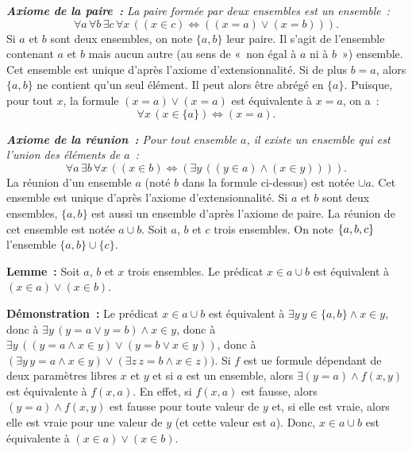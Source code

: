 \noindent\textit{\textbf{Axiome de la paire :} La paire formée par deux ensembles est un ensemble :}
\begin{equation*}
    \forall a \, \forall b \, \exists c \, \forall x \, (
        (x \in c) \Leftrightarrow ((x = a) \vee (x = b))
    ).
\end{equation*}
Si $a$ et $b$ sont deux ensembles, on note $\lbrace a, b \rbrace$ leur paire. 
Il s'agit de l'ensemble contenant $a$ et $b$ mais aucun autre (au sens de « non égal à $a$ ni à $b$ ») ensemble. 
Cet ensemble est unique d'après l'axiome d'extensionnalité.
Si de plus $b = a$, alors $\lbrace a, b \rbrace$ ne contient qu'un seul élément. 
Il peut alors être abrégé en $\lbrace a \rbrace$. 
Puisque, pour tout $x$, la formule $(x = a) \vee (x=a)$ est équivalente à $x = a$, on a : 
\begin{equation*}
    \forall x \, (x \in \lbrace a \rbrace) \Leftrightarrow (x = a). 
\end{equation*}

\medskip

\noindent\textit{\textbf{Axiome de la réunion :} Pour tout ensemble $a$, il existe un ensemble qui est l'union des éléments de $a$ :}
\begin{equation*}
    \forall a \, \exists b \, \forall x \, (
        (x \in b) \Leftrightarrow (\exists y \, ((y \in a) \wedge (x \in y)))
    ).
\end{equation*}
La réunion d'un ensemble $a$ (noté $b$ dans la formule ci-dessus) est notée $\cup a$.
Cet ensemble est unique d'après l'axiome d'extensionnalité.
Si $a$ et $b$ sont deux ensembles, $\lbrace a, b \rbrace$ est aussi un ensemble d'après l'axiome de paire. 
La réunion de cet ensemble est notée $a \cup b$. 
Soit $a$, $b$ et $c$ trois ensembles. 
On note $\left\lbrace a, b, c \right\rbrace$ l'ensemble $\lbrace a, b \rbrace \cup \lbrace c \rbrace$. 

\medskip

\noindent\textbf{Lemme :} Soit $a$, $b$ et $x$ trois ensembles. 
    Le prédicat $x \in a \cup b$ est équivalent à $(x \in a) \vee (x \in b)$.

\medskip

\noindent\textbf{Démonstration :} 
    Le prédicat $x \in a \cup b$ est équivalent à $\exists y \, y \in \lbrace a, b \rbrace \wedge x \in y$, donc à $\exists y \, (y = a \vee y = b) \wedge x \in y$, donc à $\exists y \, ((y = a \wedge x \in y) \vee (y = b \vee x \in y))$, donc à $(\exists y \, y = a \wedge x \in y) \vee (\exists z \, z = b \wedge x \in z))$.
    Si $f$ est ue formule dépendant de deux paramètres libres $x$ et $y$ et si $a$ est un ensemble, alors $\exists (y = a) \wedge f(x,y)$ est équivalente à $f(x,a)$.
    En effet, si $f(x,a)$ est fausse, alors $(y = a) \wedge f(x,y)$ est fausse pour toute valeur de $y$ et, si elle est vraie, alors elle est vraie pour une valeur de $y$ (et cette valeur est $a$). 
    Donc, $x \in a \cup b$ est équivalente à $(x \in a) \vee (x \in b)$.

